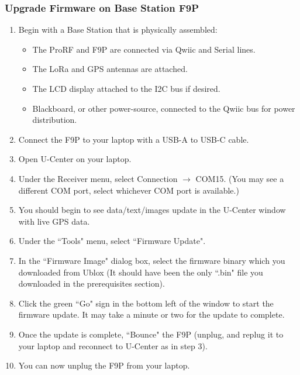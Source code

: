 \documentclass{article}%
\begin{document}
\subsubsection{Upgrade Firmware on Base Station F9P}
\begin{enumerate}
	\item Begin with a Base Station that is physically assembled:
	\begin{itemize}
		\item The ProRF and F9P are connected via Qwiic and Serial lines.
		\item The LoRa and GPS antennas are attached.
		\item The LCD display attached to the I2C bus if desired.
		\item Blackboard, or other power-source, connected to the Qwiic bus for power distribution.
	\end{itemize}
	\item Connect the F9P to your laptop with a USB-A to USB-C cable.
	\item Open U-Center on your laptop.
	\item Under the Receiver menu, select Connection $\rightarrow$ COM15. (You may see a different COM port, select whichever COM port is available.)
	\item You should begin to see data/text/images update in the U-Center window with live GPS data.
	\item Under the ``Tools" menu, select ``Firmware Update".
	\item In the ``Firmware Image" dialog box, select the firmware binary which you downloaded from Ublox (It should have been the only ``.bin" file you downloaded in the prerequisites section).
	\item Click the green ``Go" sign in the bottom left of the window to start the firmware update.  It may take a minute or two for the update to complete.
	\item Once the update is complete, ``Bounce" the F9P (unplug, and replug it to your laptop and reconnect to U-Center as in step 3).
	\item You can now unplug the F9P from your laptop.
\end{enumerate}
\end{document}
